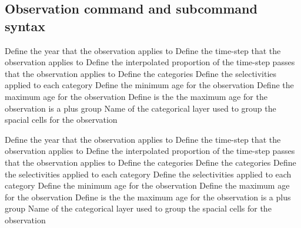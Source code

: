 \subsection{Observation command and subcommand syntax}
\par
{} {Define the year that the observation applies to}
 {Define the time-step that the observation applies to}
 {Define the interpolated proportion of the time-step passes that the observation applies to}
 {Define the categories}
 {Define the selectivities applied to each category}
 {Define the minimum age for the observation}
 {Define the maximum age for the observation}
 {Define is the the maximum age for the observation is a plus group}
 {Name of the categorical layer used to group the spacial cells for the observation}
\par {}\par
{} {Define the year that the observation applies to}
 {Define the time-step that the observation applies to}
 {Define the interpolated proportion of the time-step passes that the observation applies to}
 {Define the categories}
 {Define the categories}
 {Define the selectivities applied to each category}
 {Define the selectivities applied to each category}
 {Define the minimum age for the observation}
 {Define the maximum age for the observation}
 {Define is the the maximum age for the observation is a plus group}
 {Name of the categorical layer used to group the spacial cells for the observation}
